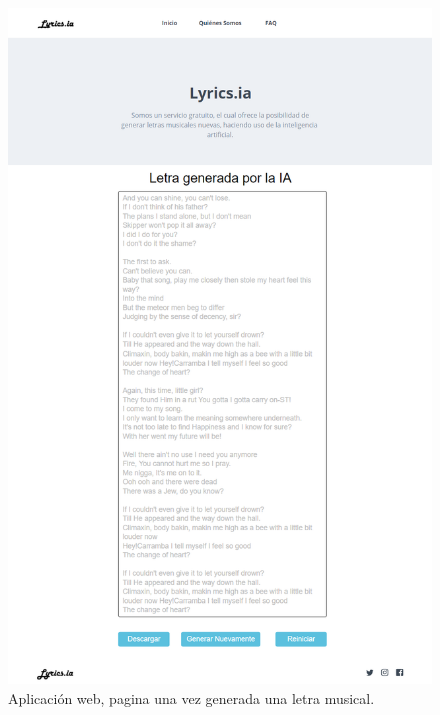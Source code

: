 \documentclass[12pt, a4paper, titlepage]{report}
\begin{document}
\begin{figure}[H] \caption{Aplicación web, pagina una vez generada una letra musical.}
	\includegraphics[width=12cm]{./imagenes/Analisis/MockFrontGenerated.png}
	\centering 
\end{figure} 
\renewcommand*\appendixpagename{{\textcolor{azulescom}{Anexos}}}
\renewcommand*\appendixtocname{{\textcolor{azulescom}{Anexos}}}
\appendixpageon
	\begin{appendices}
	\newpage
	\renewcommand*\glossaryname{{\textcolor{azulescom}{Glosario.}}}
	\printglossary
	\newpage
	\renewcommand*\glossaryname{{\textcolor{azulescom}{Acrónimos.}}}
	\printglossary[title={\textcolor{azulescom}{Acrónimos.}}, type=\acronymtype]
\end{appendices}
\end{document}
